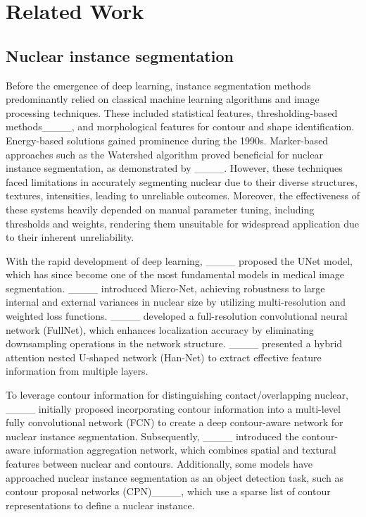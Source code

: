\section{Related Work}
\subsection{Nuclear instance segmentation}
Before the emergence of deep learning, instance segmentation methods predominantly relied on classical machine learning algorithms and image processing techniques. 
These included statistical features, thresholding-based methods____, and morphological features for contour and shape identification. 
Energy-based solutions gained prominence during the 1990s. 
Marker-based approaches such as the Watershed algorithm proved beneficial for nuclear instance segmentation, as demonstrated by ____. 
However, these techniques faced limitations in accurately segmenting nuclear due to their diverse structures, textures, intensities, leading to unreliable outcomes. 
Moreover, the effectiveness of these systems heavily depended on manual parameter tuning, including thresholds and weights, rendering them unsuitable for widespread application due to their inherent unreliability.

With the rapid development of deep learning, ____ proposed the UNet model, which has since become one of the most fundamental models in medical image segmentation. 
____ introduced Micro-Net, achieving robustness to large internal and external variances in nuclear size by utilizing multi-resolution and weighted loss functions. ____ developed a full-resolution convolutional neural network (FullNet), which enhances localization accuracy by eliminating downsampling operations in the network structure. 
____ presented a hybrid attention nested U-shaped network (Han-Net) to extract effective feature information from multiple layers.

To leverage contour information for distinguishing contact/overlapping nuclear, ____ initially proposed incorporating contour information into a multi-level fully convolutional network (FCN) to create a deep contour-aware network for nuclear instance segmentation. Subsequently,
____ introduced the contour-aware information aggregation network, which combines spatial and textural features between nuclear and contours. 
Additionally, some models have approached nuclear instance segmentation as an object detection task, such as contour proposal networks (CPN)____, which use a sparse list of contour representations to define a nuclear instance.

